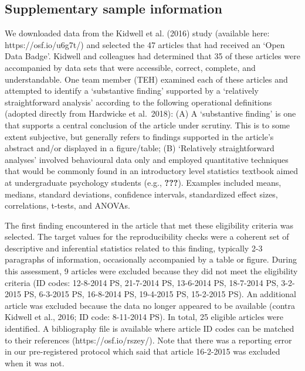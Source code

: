 \clearpage
\makeatletter
\efloat@restorefloats
\makeatother


\begin{appendix}
\hypertarget{sup_sample}{%
\section{Supplementary sample information}\label{sup_sample}}

We downloaded data from the Kidwell et al. (2016) study (available here:
https://osf.io/u6g7t/) and selected the 47 articles that had received an
`Open Data Badge'. Kidwell and colleagues had determined that 35 of
these articles were accompanied by data sets that were accessible,
correct, complete, and understandable. One team member (TEH) examined
each of these articles and attempted to identify a `substantive finding'
supported by a `relatively straightforward analysis' according to the
following operational definitions (adopted directly from Hardwicke et
al.~2018): (A) A `substantive finding' is one that supports a central
conclusion of the article under scrutiny. This is to some extent
subjective, but generally refers to findings supported in the article's
abstract and/or displayed in a figure/table; (B) `Relatively
straightforward analyses' involved behavioural data only and employed
quantitative techniques that would be commonly found in an introductory
level statistics textbook aimed at undergraduate psychology students
(e.g., {\textbf{???}}). Examples included means, medians, standard
deviations, confidence intervals, standardized effect sizes,
correlations, t-tests, and ANOVAs.

The first finding encountered in the article that met these eligibility
criteria was selected. The target values for the reproducibility checks
were a coherent set of descriptive and inferential statistics related to
this finding, typically 2-3 paragraphs of information, occasionally
accompanied by a table or figure. During this assessment, 9 articles
were excluded because they did not meet the eligibility criteria (ID
codes: 12-8-2014 PS, 21-7-2014 PS, 13-6-2014 PS, 18-7-2014 PS, 3-2-2015
PS, 6-3-2015 PS, 16-8-2014 PS, 19-4-2015 PS, 15-2-2015 PS). An
additional article was excluded because the data no longer appeared to
be available (contra Kidwell et al., 2016; ID code: 8-11-2014 PS). In
total, 25 eligible articles were identified. A bibliography file is
available where article ID codes can be matched to their references
(https://osf.io/rszey/). Note that there was a reporting error in our
pre-registered protocol which said that article 16-2-2015 was excluded
when it was not.


\end{appendix}
